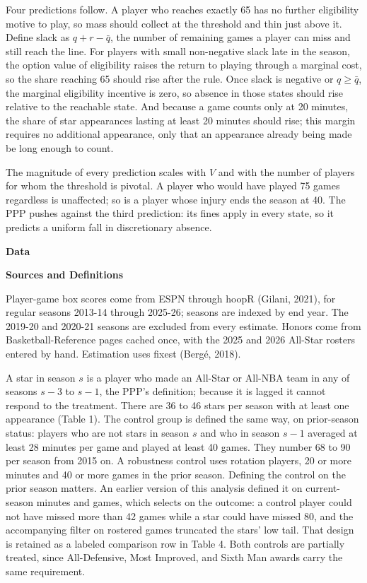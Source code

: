 \documentclass[12pt]{article}
\newcommand{\lone}[1]{\par\medskip\noindent\begin{center}\textbf{#1}\end{center}\par\nopagebreak}
\newcommand{\ltwo}[1]{\par\medskip\noindent\textbf{#1}\par\nopagebreak}
\begin{document}
Four predictions follow. A player who reaches exactly 65 has no further eligibility motive to play, so mass should collect at the threshold and thin just above it. Define slack as $q + r - \bar q$, the number of remaining games a player can miss and still reach the line. For players with small non-negative slack late in the season, the option value of eligibility raises the return to playing through a marginal cost, so the share reaching 65 should rise after the rule. Once slack is negative or $q \geq \bar q$, the marginal eligibility incentive is zero, so absence in those states should rise relative to the reachable state. And because a game counts only at 20 minutes, the share of star appearances lasting at least 20 minutes should rise; this margin requires no additional appearance, only that an appearance already being made be long enough to count.

The magnitude of every prediction scales with $V$ and with the number of players for whom the threshold is pivotal. A player who would have played 75 games regardless is unaffected; so is a player whose injury ends the season at 40. The PPP pushes against the third prediction: its fines apply in every state, so it predicts a uniform fall in discretionary absence.


\lone{Data}



\ltwo{Sources and Definitions}


Player-game box scores come from ESPN through hoopR (Gilani, 2021), for regular seasons 2013-14 through 2025-26; seasons are indexed by end year. The 2019-20 and 2020-21 seasons are excluded from every estimate. Honors come from Basketball-Reference pages cached once, with the 2025 and 2026 All-Star rosters entered by hand. Estimation uses fixest (Bergé, 2018).

A star in season $s$ is a player who made an All-Star or All-NBA team in any of seasons $s-3$ to $s-1$, the PPP's definition; because it is lagged it cannot respond to the treatment. There are 36 to 46 stars per season with at least one appearance (Table 1). The control group is defined the same way, on prior-season status: players who are not stars in season $s$ and who in season $s-1$ averaged at least 28 minutes per game and played at least 40 games. They number 68 to 90 per season from 2015 on. A robustness control uses rotation players, 20 or more minutes and 40 or more games in the prior season. Defining the control on the prior season matters. An earlier version of this analysis defined it on current-season minutes and games, which selects on the outcome: a control player could not have missed more than 42 games while a star could have missed 80, and the accompanying filter on rostered games truncated the stars' low tail. That design is retained as a labeled comparison row in Table 4. Both controls are partially treated, since All-Defensive, Most Improved, and Sixth Man awards carry the same requirement.
\end{document}
